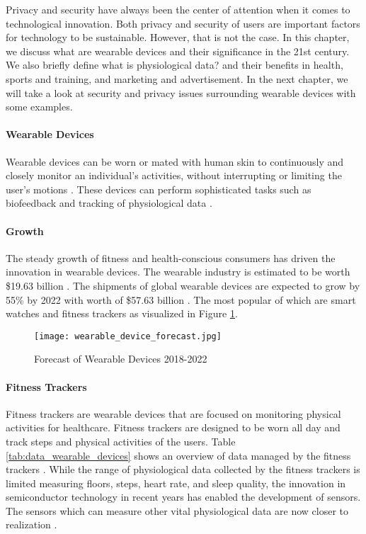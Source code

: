 \label{chapter:introduction}
Privacy and security have always been the center of attention when it comes to technological innovation. Both privacy and security of users are important factors for technology to be sustainable. However, that is not the case. In this chapter, we discuss what are wearable devices and their significance in the 21st century. We also briefly define what is physiological data? and their benefits in health, sports and training, and marketing and advertisement. In the next chapter, we will take a look at security and privacy issues surrounding wearable devices with some examples. 

\paragraph{Wearable Devices}
Wearable devices can be worn or mated with human skin to continuously and closely monitor an individual’s activities, without interrupting or limiting the user’s motions \cite{gao_fully_2016}. These devices can perform sophisticated tasks such as biofeedback and tracking of physiological data \cite{noauthor_wearable_nodate}.

\paragraph{Growth} The steady growth of fitness and health-conscious consumers has driven the innovation in wearable devices. The wearable industry is estimated to be worth \$19.63 billion \cite{noauthor_wearable_market_nodate}. The shipments of global wearable devices are expected to grow by 55\% by 2022 \cite{WearableStudy} with worth of \$57.63 billion \cite{noauthor_wearable_market_nodate}. The most popular of which are smart watches and fitness trackers as visualized in Figure \ref{fig:forecast_of_wearable_devices}.

\begin{figure}
    \centering
    \texttt{[image: wearable\_device\_forecast.jpg]}
    \caption{Forecast of Wearable Devices 2018-2022 \cite{WearableStudy}}
    \label{fig:forecast_of_wearable_devices}
\end{figure}


\paragraph{Fitness Trackers}
Fitness trackers are wearable devices that are focused on monitoring physical activities for healthcare. Fitness trackers are designed to be worn all day and track steps and physical activities of the users. Table \ref{tab:data_wearable_devices} shows an overview of data managed by the fitness trackers \cite{mendoza_assessment_2018}. While the range of physiological data collected by the fitness trackers is limited measuring floors, steps, heart rate, and sleep quality, the innovation in semiconductor technology in recent years has enabled the development of sensors. The sensors which can measure other vital physiological data are now closer to realization \cite{haghi_wearable_2017}. 

